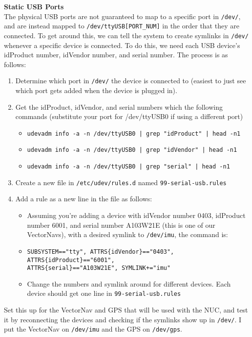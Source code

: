 \documentclass{article}
\begin{document}
{\bf Static USB Ports} \\
The physical USB ports are not guaranteed to map to a specific port in \texttt{/dev/}, and are instead mapped to \texttt{/dev/ttyUSB[PORT\_NUM]} in the order that they are connected.
To get around this, we can tell the system to create symlinks in \texttt{/dev/} whenever a specific device is connected.
To do this, we need each USB device's idProduct number, idVendor number, and serial number.
The process is as follows:
\begin{enumerate}[nosep]
\item Determine which port in \texttt{/dev/} the device is connected to (easiest to just see which port gets added when the device is plugged in).
\item Get the idProduct, idVendor, and serial numbers which the following commands (substitute your port for /dev/ttyUSB0 if using a different port)
  \begin{itemize}[nosep]
  \item \texttt{udevadm info -a -n /dev/ttyUSB0 | grep "idProduct" | head -n1}
  \item \texttt{udevadm info -a -n /dev/ttyUSB0 | grep "idVendor" | head -n1}
  \item \texttt{udevadm info -a -n /dev/ttyUSB0 | grep "serial" | head -n1}
  \end{itemize}
\item Create a new file in \texttt{/etc/udev/rules.d} named \texttt{99-serial-usb.rules}
\item Add a rule as a new line in the file as follows:
\begin{itemize}[nosep]
\item Assuming you're adding a device with idVendor number 0403, idProduct number 6001, and serial number A103W21E (this is one of our VectorNavs), with a desired symlink to \texttt{/dev/imu}, the command is:
\item \texttt{SUBSYSTEM=="tty", ATTRS\{idVendor\}=="0403", ATTRS\{idProduct\}=="6001",} \\
      \texttt{ATTRS\{serial\}=="A103W21E", SYMLINK+="imu"}
\item Change the numbers and symlink around for different devices. Each device should get one line in \texttt{99-serial-usb.rules}
\end{itemize}
\end{enumerate}

Set this up for the VectorNav and GPS that will be used with the NUC, and test it by reconnecting the devices and checking if the symlinks show up in \texttt{/dev/}.
I put the VectorNav on \texttt{/dev/imu} and the GPS on \texttt{/dev/gps}. \\
\end{document}
